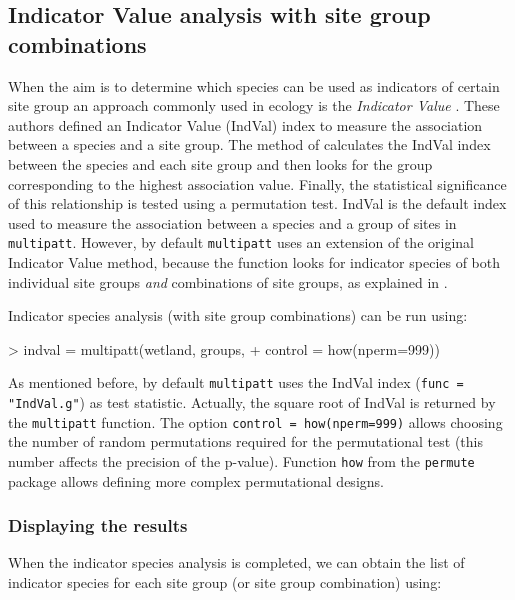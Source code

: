 \documentclass[11pt,a4paper]{article}
\begin{document}
\subsection{Indicator Value analysis with site group combinations}
When the aim is to determine which species can be used as indicators of certain site group an approach commonly used in ecology is the \emph{Indicator Value} \citep{Dufrene1997}. These authors defined an Indicator Value (IndVal) index to measure the association between a species and a site group. The method of \citet{Dufrene1997} calculates the IndVal index between the species and each site group and then looks for the group corresponding to the highest association value. Finally, the statistical significance of this relationship is tested using a permutation test. IndVal is the default index used to measure the association between a species and a group of sites in \texttt{multipatt}. However, by default \texttt{multipatt} uses an extension of the original Indicator Value method, because the function looks for indicator species of both individual site groups \emph{and} combinations of site groups, as explained in \citet{DeCaceres2010}. 

Indicator species analysis (with site group combinations) can be run using:
\begin{Schunk}
\begin{Sinput}
> indval = multipatt(wetland, groups, 
+                    control = how(nperm=999)) 
\end{Sinput}
\end{Schunk}
As mentioned before, by default \texttt{multipatt} uses the IndVal index (\texttt{func = "IndVal.g"}) as test statistic. Actually, the square root of IndVal is returned by the \texttt{multipatt} function. The option \texttt{control = how(nperm=999)} allows choosing the number of random permutations required for the permutational test (this number affects the precision of the p-value). Function \texttt{how} from the \texttt{permute} package allows defining more complex permutational designs. 

\subsubsection{Displaying the results}
When the indicator species analysis is completed, we can obtain the list of indicator species for each site group (or site group combination) using:
\end{document}
